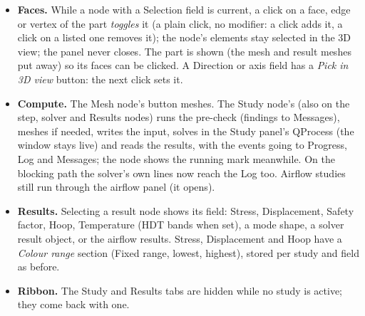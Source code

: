 \begin{itemize}[nosep]
        field and writes nothing; a good value goes through  (one undo step) and the field shows the
        normalised value. Enums are combo boxes, switches check boxes, vectors three fields.
  \item \textbf{Faces.} While a node with a Selection field is current, a click on a face, edge or vertex of the part
        \emph{toggles} it (a plain click, no modifier: a click adds it, a click on a listed one removes it); the node's
        elements stay selected in the 3D view; the panel never closes. The part is shown (the mesh and result meshes put
        away) so its faces can be clicked. A Direction or axis field has a \emph{Pick in 3D view} button: the next click
        sets it.
  \item \textbf{Compute.} The Mesh node's button meshes. The Study node's (also on the step, solver and Results nodes)
        runs the pre-check (findings to Messages), meshes if needed, writes the input, solves in the Study panel's
        QProcess (the window stays live) and reads the results, with the events going to Progress, Log and Messages; the node
        shows the running mark meanwhile. On the blocking path the solver's own lines now reach the Log too. Airflow studies
        still run through the airflow panel (it opens).
  \item \textbf{Results.} Selecting a result node shows its field: Stress, Displacement, Safety factor, Hoop, Temperature
        (HDT bands when set), a mode shape, a solver result object, or the airflow results. Stress, Displacement and Hoop have
        a \emph{Colour range} section (Fixed range, lowest, highest), stored per study and field as before.
  \item \textbf{Ribbon.} The Study and Results tabs are hidden while no study is active; they come back with one.
\end{itemize}

